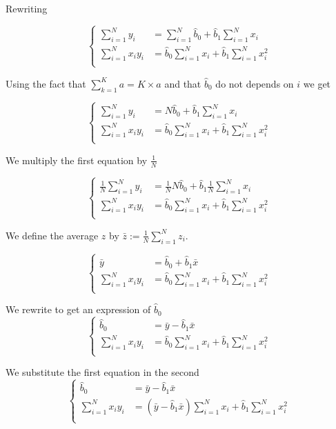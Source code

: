 \documentclass[a4paper,12pt]{article}
\newcommand\bhat[1]{\hat{b}_#1}
\newcommand\sumin{\sum_{i=1}^N}
\begin{document}
Rewriting

\[
\begin{cases}
	\sumin y_i &= \sumin \bhat{0} + \bhat{1} \sumin x_i\\
	\sumin x_i y_i &= \bhat{0} \sumin x_i  + \bhat{1} \sumin x_i^2 \\
\end{cases}
\]

Using the fact that $\sum_{k=1}^K a = K\times a$ and that $\bhat{0}$ do not depends on $i$ we get

\[
\begin{cases}
	\sumin y_i &= N \bhat{0} + \bhat{1} \sumin x_i\\
	\sumin x_i y_i &= \bhat{0} \sumin x_i  + \bhat{1} \sumin x_i^2 \\
\end{cases}
\]

We multiply the first equation by $\frac{1}{N}$

\[
\begin{cases}
	\frac{1}{N}\sumin y_i &= \frac{1}{N} N \bhat{0} + \bhat{1} \frac{1}{N} \sumin x_i\\
	\sumin x_i y_i &= \bhat{0} \sumin x_i  + \bhat{1} \sumin x_i^2 \\
\end{cases}
\]

We define the average $z$ by $\bar{z} := \frac{1}{N}\sumin z_i$.

\[
\begin{cases}
	\bar{y} &= \bhat{0} + \bhat{1} \bar{x}\\
	\sumin x_i y_i &= \bhat{0} \sumin x_i  + \bhat{1} \sumin x_i^2 \\
\end{cases}
\]

We rewrite to get an expression of $\bhat{0}$
\[
\begin{cases}
	\bhat{0} &= \bar{y} - \bhat{1} \bar{x}\\
	\sumin x_i y_i &= \bhat{0} \sumin x_i  + \bhat{1} \sumin x_i^2 \\
\end{cases}
\]

We substitute the first equation in the second
\[
\begin{cases}
	\bhat{0} &= \bar{y} - \bhat{1} \bar{x}\\
	\sumin x_i y_i &= (\bar{y} - \bhat{1} \bar{x}) \sumin x_i  + \bhat{1} \sumin x_i^2 \\
\end{cases}
\]
\end{document}
